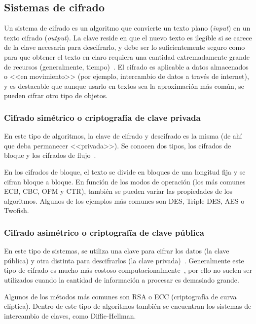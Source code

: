 \subsection{Sistemas de cifrado}

Un sistema de cifrado es un algoritmo que convierte un texto plano (\textit{input}) en un texto cifrado (\textit{output}). La clave reside en que el nuevo texto es ilegible si se carece de la clave necesaria para descifrarlo, y debe ser lo suficientemente seguro como para que obtener el texto en claro requiera una cantidad extremadamente grande de recursos (generalmente, tiempo)~\cite{cifradoAvast}. El cifrado es aplicable a datos almacenados o <<en movimiento>> (por ejemplo, intercambio de datos a través de internet), y es destacable que aunque usarlo en textos sea la aproximación más común, se pueden cifrar otro tipo de objetos.

\subsubsection{Cifrado simétrico o criptografía de clave privada}

En este tipo de algoritmos, la clave de cifrado y descifrado es la misma (de ahí que deba permanecer <<privada>>). Se conocen dos tipos, los cifrados de bloque y los cifrados de flujo~\cite{apuntesCybersec}.

En los cifrados de bloque, el texto se divide en bloques de una longitud fija y se cifran bloque a bloque. En función de los modos de operación (los más comunes ECB, CBC, OFM y CTR), también se pueden variar las propiedades de los algoritmos. Algunos de los ejemplos más comunes son DES, Triple DES, AES o Twofish.

\subsubsection{Cifrado asimétrico o criptografía de clave pública}

En este tipo de sistemas, se utiliza una clave para cifrar los datos (la clave pública) y otra distinta para descifrarlos (la clave privada)~\cite{cifradoIBM}. Generalmente este tipo de cifrado es mucho más costoso computacionalmente~\cite{apuntesCybersec}, por ello no suelen ser utilizados cuando la cantidad de información a procesar es demasiado grande. 

Algunos de los métodos más comunes son RSA o ECC (criptografía de curva elíptica). Dentro de este tipo de algoritmos también se encuentran los sistemas de intercambio de claves, como Diffie-Hellman.

